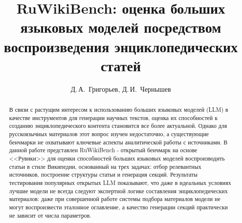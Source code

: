 \documentclass{article}
\begin{document}
\raggedbottom
\Volume{ }
\Pages{ }


\title{RuWikiBench: оценка больших языковых моделей посредством воспроизведения энциклопедических статей}

\author{Д.\,А.~Григорьев\Addressmark[1]\Emailmark[1], Д.\,И.~Чернышев\Addressmark[1]\Emailmark[2]}






\dateA{ }
\dateB{ }
\dateC{ }





\maketitle

\begin{abstract}
В связи с растущим интересом к использованию больших языковых моделей (LLM) в качестве инструментов для генерации научных текстов, 
оценка их способностей к созданию энциклопедического контента становится все более актуальной.
Однако для русскоязычных материалов этот вопрос изучен недостаточно, а существующие бенчмарки не охватывают ключевые аспекты аналитической работы с источниками.
В данной работе представлен RuWikiBench - открытый бенчмарк на основе <<Рувики>> для оценки способностей больших языковых моделей воспроизводить статьи в стиле Википедии, 
основанный на трех задачах: отбор релевантных источников, построение структуры статьи и генерация секций.
Результаты тестирования популярных открытых LLM показывают, что даже в идеальных условиях лучшие модели не всегда следуют экспертной логике составления энциклопедических материалов: 
даже при совершенной работе системы подбора материалов модели не могут воспроизвести эталонное оглавление, а качество генерации секций практически не зависит от числа параметров.
\end{abstract}
\end{document}
